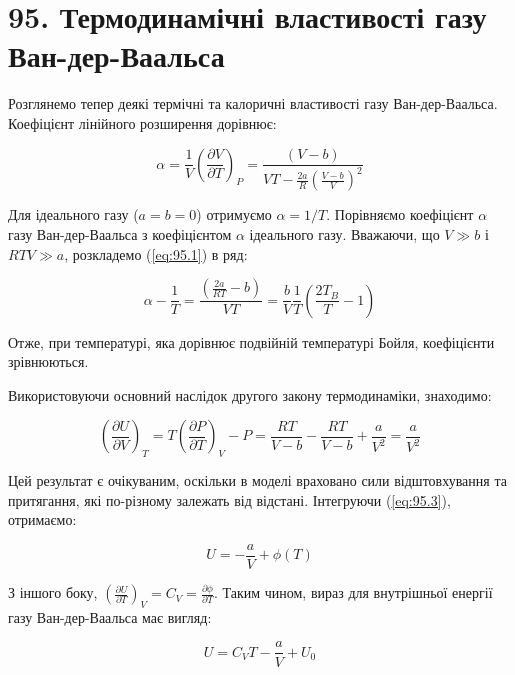 \documentclass{article}
\begin{document}
\section*{95. Термодинамічні властивості газу Ван-дер-Ваальса}

Розглянемо тепер деякі термічні та калоричні властивості газу Ван-дер-Ваальса. Коефіцієнт лінійного
розширення дорівнює:

\begin{equation}
\alpha = \frac{1}{V}\left( \frac{\partial V}{\partial T} \right)_{P} = \frac{(V - b)}{VT -
\frac{2a}{R}\left( \frac{V - b}{V} \right)^{2}}
\label{eq:95.1}
\end{equation}

Для ідеального газу ($a = b = 0$) отримуємо $\alpha = 1/T$. Порівняємо коефіцієнт $\alpha$ газу
Ван-дер-Ваальса з коефіцієнтом $\alpha$ ідеального газу. Вважаючи, що $V \gg b$ і $RTV \gg a$,
розкладемо (\ref{eq:95.1}) в ряд:

\begin{equation}
\alpha - \frac{1}{T} = \frac{\left( \frac{2a}{RT} - b \right)}{VT} = \frac{b}{V}\frac{1}{T}\left(
\frac{2T_{B}}{T} - 1 \right)
\label{eq:95.2}
\end{equation}

Отже, при температурі, яка дорівнює подвійній температурі Бойля, коефіцієнти зрівнюються.

Використовуючи основний наслідок другого закону термодинаміки, знаходимо:

\begin{equation}
\left( \frac{\partial U}{\partial V} \right)_{T} = T\left( \frac{\partial P}{\partial T} \right)_{V} -
P = \frac{RT}{V - b} - \frac{RT}{V - b} + \frac{a}{V^{2}} = \frac{a}{V^{2}}
\label{eq:95.3}
\end{equation}

Цей результат є очікуваним, оскільки в моделі враховано сили відштовхування та притягання, які
по-різному залежать від відстані. Інтегруючи (\ref{eq:95.3}), отримаємо:

\begin{equation}
U = -\frac{a}{V} + \phi(T)
\label{eq:95.4}
\end{equation}

З іншого боку, $\left( \frac{\partial U}{\partial T} \right)_{V} = C_{V} = \frac{\partial
\phi}{\partial T}$. Таким чином, вираз для внутрішньої енергії газу Ван-дер-Ваальса має вигляд:

\begin{equation}
U = C_{V}T - \frac{a}{V} + U_{0}
\label{eq:95.5}
\end{equation}
\end{document}
